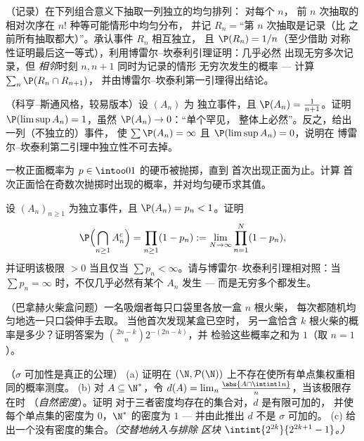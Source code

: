 \begin{exercise}[$\star\star\star$]\label{exo:b2:proba:7}
（记录）在下列组合意义下抽取一列独立的均匀排列：
对每个 $n$，
前 $n$ 次抽取的相对次序在 $n!$ 种等可能情形中均匀分布，
并记 $R_n = {}$“第 $n$ 次抽取是记录（比
之前所有抽取都大）”。承认事件 $R_n$ 相互独立，
且 $\P(R_n) = 1/n$（至少借助
对称性证明最后这一等式），利用博雷尔–坎泰利引理证明：几乎必然
出现无穷多次记录，但
\emph{相邻}时刻 $n, n+1$ 同时为记录的情形
无穷次发生的概率 --- 计算 $\sum_n \P(R_n \cap R_{n+1})$，
并由博雷尔–坎泰利第一引理得出结论。
\end{exercise}

\begin{exercise}[$\star\star\star$]\label{exo:b2:proba:8}
（科亨–斯通风格，较易版本）设 $(A_n)$ 为
独立事件，且 $\P(A_n) = \frac{1}{n+1}$。证明
$\P(\limsup A_n) = 1$，虽然 $\P(A_n) \to 0$：“单个罕见，
整体上必然”。反之，给出一列（不独立的）事件，
使 $\sum\P(A_n) = \infty$ 且
$\P(\limsup A_n) = 0$，说明在
博雷尔–坎泰利第二引理中独立性不可去掉。
\end{exercise}

\begin{exercise}[$\star$]\label{exo:b2:proba:9}
一枚正面概率为 $p \in \intoo01$ 的硬币被抛掷，直到
首次出现正面为止。计算
首次正面恰在奇数次抛掷时出现的概率，并对均匀硬币求其值。
\end{exercise}

\begin{exercise}[$\star\star$]\label{exo:b2:proba:10}
设 $(A_n)_{n\geq1}$ 为独立事件，且 $\P(A_n) =
p_n < 1$。证明
\[
\P\Bigl(\bigcap_{n\geq1}A_n^c\Bigr)
= \prod_{n\geq1}(1 - p_n)
:= \lim_{N\to\infty}\prod_{n=1}^N(1 - p_n),
\]
并证明该极限 $> 0$ 当且仅当 $\sum p_n <
\infty$。请与博雷尔–坎泰利引理相对照：当 $\sum p_n =
\infty$ 时，不仅几乎必然有某个 $A_n$ 发生 ---
而是无穷多个都发生。
\end{exercise}

\begin{exercise}[$\star\star$]\label{exo:b2:proba:11}
（巴拿赫火柴盒问题）一名吸烟者每只口袋里各放一盒 $n$ 根火柴，
每次都随机均匀地选一只口袋伸手去取。
当他首次发现某盒已空时，
另一盒恰含 $k$ 根火柴的概率是多少？证明答案为
$\binom{2n-k}{n}2^{-(2n-k)}$，并
检验这些概率之和为 $1$（取 $n = 1$）。
\end{exercise}

\begin{exercise}[$\star\star\star$]\label{exo:b2:proba:12}
（$\sigma$ 可加性是真正的公理）
(a) 证明在 $(\N,
\mathcal P(\N))$ 上不存在使所有单点集权重相同的概率测度。
(b) 对 $A \subseteq \N^*$，令 $d(A) =
\lim_n\frac{\abs{A\cap\intint1n}}{n}$，当该极限存在时
（\emph{自然密度}）。证明
对于三者密度均存在的集合对，$d$ 是有限可加的，
并使每个单点集的密度为 $0$，$\N^*$ 的密度为 $1$ ---
并由此推出 $d$ 不是 $\sigma$ 可加的。
(c) 给出一个没有密度的集合。\emph{（交替地纳入与排除
区块 $\intint{2^{2k}}{2^{2k+1}-1}$。）}
\end{exercise}

